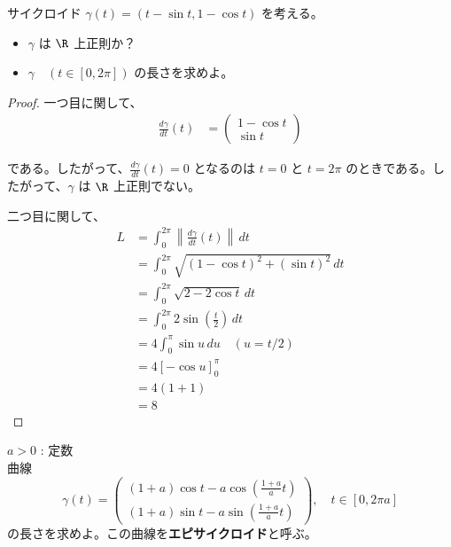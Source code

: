 \documentclass[article,paper=a4paper]{jlreq}
\begin{document}
\begin{prob}
    \quad サイクロイド $\gamma(t) = (t - \sin t, 1 - \cos t)$ を考える。
    \begin{itemize}
        \item $\gamma$ は $\R$ 上正則か？
        \item $\gamma \quad (t \in [0, 2\pi])$ の長さを求めよ。
    \end{itemize}
\end{prob}

\begin{proof}
    一つ目に関して、
    \begin{align*}
        \frac{d\gamma}{dt}(t) &= \begin{pmatrix}
1 - \cos t \\ \sin t
        \end{pmatrix}
    \end{align*}

    である。したがって、$\frac{d\gamma}{dt}(t) = 0$ となるのは $t=0$ と $t=2\pi$ のときである。したがって、$\gamma$ は $\R$ 上正則でない。

    二つ目に関して、
    \begin{align*}
        L &= \int_0^{2\pi} \left\|\frac{d\gamma}{dt}(t)\right\| \,dt \\
        &= \int_0^{2\pi} \sqrt{(1 - \cos t)^2 + (\sin t)^2} \,dt \\
        &= \int_0^{2\pi} \sqrt{2 - 2\cos t} \,dt \\
        &= \int_0^{2\pi} 2\sin\left(\frac{t}{2}\right) \,dt \\
        &= 4 \int_0^{\pi} \sin u \,du \quad (u = t/2) \\
        &= 4 \left[-\cos u\right]_0^{\pi} \\
        &= 4 (1 + 1) \\
        &= 8
    \end{align*}
\end{proof}

\begin{prob}
    \quad $a > 0$ : 定数\\
    曲線
    \[\gamma(t) = \begin{pmatrix}
        \left(1+a\right)\cos t-a\cos\left(\frac{1+a}{a}t\right)\\(1+a)\sin t-a\sin\left(\frac{1+a}{a}t\right)\end{pmatrix},\quad t \in [0, 2\pi a]\]
    の長さを求めよ。この曲線を\textbf{エピサイクロイド}と呼ぶ。
\end{prob}        
\end{document}
